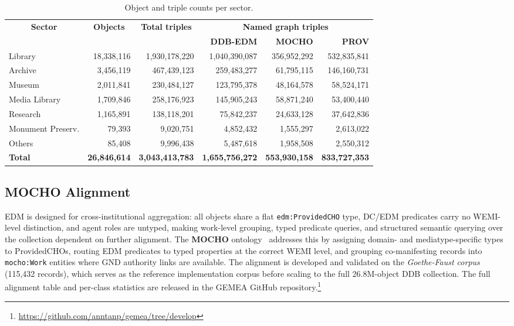 \begin{table}[h]
\centering
\caption{Object and triple counts per sector.}
\label{tab:scale}
\begin{tabular}{|l|r|r|r|r|r|}
\hline
\multicolumn{1}{|c|}{\multirow{2}{*}{\textbf{Sector}}} & \multicolumn{1}{c|}{\multirow{2}{*}{\textbf{Objects}}} & \multicolumn{1}{c|}{\multirow{2}{*}{\textbf{Total triples}}} & \multicolumn{3}{c|}{\textbf{Named graph triples}} \\
\cline{4-6}
 & & & \textbf{DDB-EDM} & \textbf{MOCHO} & \textbf{PROV} \\
\hline
\rowcolor{gray!15}
Library           & 18,338,116 & 1,930,178,220 & 1,040,390,087 & 356,952,292 & 532,835,841 \\
\hline
Archive           &  3,456,119 & 467,439,123 & 259,483,277 & 61,795,115 & 146,160,731 \\
\hline
\rowcolor{gray!15}
Museum            &  2,011,841 & 230,484,127 & 123,795,378 & 48,164,578 & 58,524,171 \\
\hline
Media Library     &  1,709,846 & 258,176,923 & 145,905,243 & 58,871,240 & 53,400,440 \\
\hline
\rowcolor{gray!15}
Research          &  1,165,891 & 138,118,201 & 75,842,237 & 24,633,128 & 37,642,836 \\
\hline
Monument Preserv. &     79,393 & 9,020,751 & 4,852,432 & 1,555,297 & 2,613,022 \\
\hline
\rowcolor{gray!15}
Others            &     85,408 & 9,996,438 & 5,487,618 & 1,958,508 & 2,550,312 \\
\hline
\rowcolor{gray!30}
\textbf{Total}    & \textbf{26,846,614} & \textbf{3,043,413,783} & \textbf{1,655,756,272} & \textbf{553,930,158} & \textbf{833,727,353} \\
\hline
\end{tabular}
\end{table}

\subsection{MOCHO Alignment}
\label{sec:resource:mocho}

EDM is designed for cross-institutional aggregation: all objects share a flat \texttt{edm:ProvidedCHO} type, DC/EDM predicates carry no WEMI-level distinction, and agent roles are untyped, making work-level grouping, typed predicate queries, and structured semantic querying over the collection dependent on further alignment.
The \textbf{MOCHO} ontology~\cite{tan2026navigating} addresses this by assigning domain- and mediatype-specific types to ProvidedCHOs, routing EDM predicates to typed properties at the correct WEMI level, and grouping co-manifesting records into \texttt{mocho:Work} entities where GND authority links are available.
The alignment is developed and validated on the \textit{Goethe-Faust corpus} (115,432 records), which serves as the reference implementation corpus before scaling to the full 26.8M-object DDB collection.
The full alignment table and per-class statistics are released in the GEMEA GitHub repository.\footnote{\url{https://github.com/anntanp/gemea/tree/develop}}

